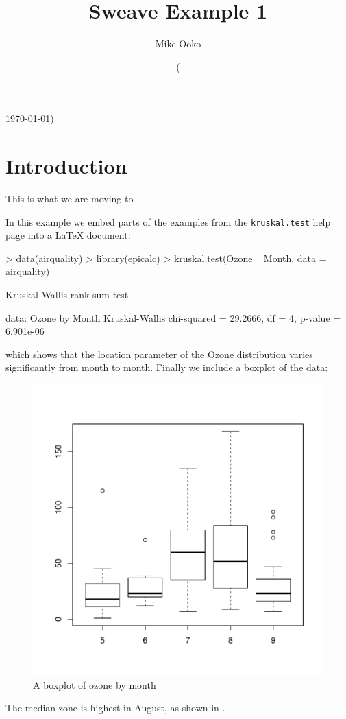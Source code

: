 \documentclass[a4paper]{report}
\begin{document}



\title{Sweave Example 1}
\author{Mike Ooko}
\date(\today)

\section{Introduction}
This is what we are moving to


\maketitle
In this example we embed parts of the examples from the
\texttt{kruskal.test} help page into a \LaTeX{} document:
\begin{Schunk}
\begin{Sinput}
> data(airquality)
> library(epicalc)
> kruskal.test(Ozone ~ Month, data = airquality)
\end{Sinput}
\begin{Soutput}
	Kruskal-Wallis rank sum test

data:  Ozone by Month
Kruskal-Wallis chi-squared = 29.2666, df = 4, p-value = 6.901e-06
\end{Soutput}
\end{Schunk}
which shows that the location parameter of the Ozone
distribution varies significantly from month to month. Finally we
include a boxplot of the data:


\begin{figure}[H]
\begin{center}

\includegraphics{myfile-002}

\end{center}
\caption{A boxplot of ozone by month}
\label{fig:fig1}
\end{figure}


The median zone is highest in August, as shown in .
\end{document}
